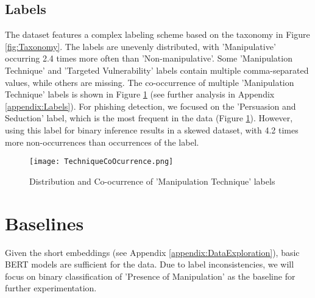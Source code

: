 \documentclass[
	letterpaper, %
	12pt, %
	unnumberedsections, %
	twoside, %
]{LTJournalArticle}
\begin{document}
\subsection{Labels}
The dataset features a complex labeling scheme based on the taxonomy in Figure \ref{fig:Taxonomy}. The labels are unevenly distributed, with 'Manipulative' occurring 2.4 times more often than 'Non-manipulative'. Some 'Manipulation Technique' and 'Targeted Vulnerability' labels contain multiple comma-separated values, while others are missing. The co-occurrence of multiple 'Manipulation Technique' labels is shown in Figure \ref{fig:TechCoOcurrence} (see further analysis in Appendix \ref{appendix:Labels}). For phishing detection, we focused on the 'Persuasion and Seduction' label, which is the most frequent in the data (Figure \ref{fig:TechCoOcurrence}). However, using this label for binary inference results in a skewed dataset, with 4.2 times more non-occurrences than occurrences of the label.

\begin{figure}[!htp] %
	\centering
	\texttt{[image: TechniqueCoOcurrence.png]}
	\caption{Distribution and Co-ocurrence of 'Manipulation Technique' labels}
	\label{fig:TechCoOcurrence}
\end{figure}







\section{Baselines}
Given the short embeddings (see Appendix \ref{appendix:DataExploration}), basic BERT models are sufficient for the data. Due to label inconsistencies, we will focus on binary classification of 'Presence of Manipulation' as the baseline for further experimentation.
\end{document}
